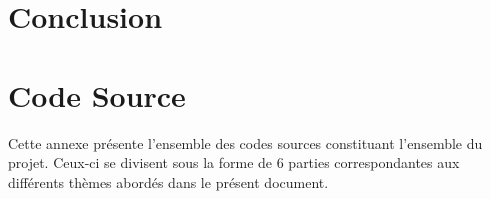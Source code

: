 \documentclass{report}
\begin{document}
\chapter*{Conclusion}




\appendix
\chapter{Code Source}
Cette annexe présente l'ensemble des codes sources constituant l'ensemble du projet. Ceux-ci se divisent sous la forme de 6 parties correspondantes aux différents thèmes abordés dans le présent document. \\

\label{src:Benchmark}
\end{document}
